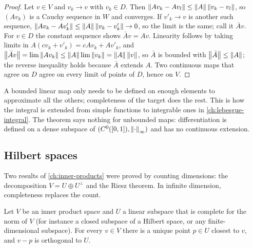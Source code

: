 \begin{notechapter}
\begin{proof}
Let $v\in V$ and $v_k\to v$ with $v_k\in D$. Then
$\left\|Av_k - Av_l\right\|\leq\left\|A\right\|\left\|v_k - v_l\right\|$, so $(Av_k)$ is a Cauchy
sequence in $W$ and converges. If $v'_k\to v$ is another such sequence,
$\left\|Av_k - Av'_k\right\|\leq\left\|A\right\|\left\|v_k - v'_k\right\|\to0$, so the limit is the
same; call it $\bar Av$. For $v\in D$ the constant sequence shows
$\bar Av = Av$. Linearity follows by taking limits in
$A(cv_k + v'_k) = cAv_k + Av'_k$, and
$\left\|\bar Av\right\| = \lim\left\|Av_k\right\|\leq\left\|A\right\|\lim\left\|v_k\right\|
= \left\|A\right\|\left\|v\right\|$, so $\bar A$ is bounded with $\left\|\bar A\right\|\leq\left\|A\right\|$;
the reverse inequality holds because $\bar A$ extends $A$. Two continuous
maps that agree on $D$ agree on every limit of points of $D$, hence on
$V$.
\end{proof}

\begin{intuition}
A bounded linear map only needs to be defined on enough elements to
approximate all the others; completeness of the target does the rest. This
is how the integral is extended from simple functions to integrable ones
in \cref{ch:lebesgue-integral}. The theorem says nothing for unbounded
maps: differentiation is defined on a dense subspace of
$(C^0([0, 1]), \left\|\cdot\right\|_\infty)$ and has no continuous extension.
\end{intuition}

\subsection{Hilbert spaces}

Two results of \cref{ch:inner-products} were proved by counting
dimensions: the decomposition $V = U\oplus U^\perp$ and the Riesz theorem.
In infinite dimension, completeness replaces the count.

\begin{theorem}
\label{norms-banach:thm:projection}
Let $V$ be an inner product space and $U$ a linear subspace that is
complete for the norm of $V$ (for instance a closed subspace of a Hilbert
space, or any finite-dimensional subspace). For every $v\in V$ there is a
unique point $p\in U$ closest to $v$, and $v - p$ is orthogonal to $U$.
\end{theorem}


\end{notechapter}
